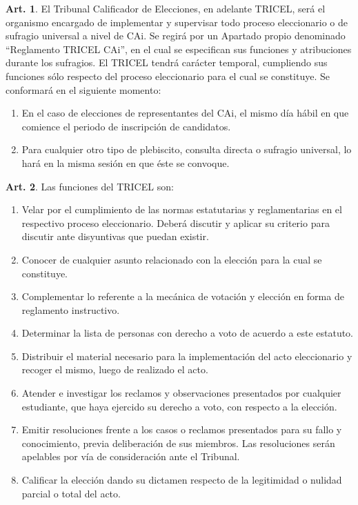 \documentclass[letterpaper,11pt]{article}
\theoremstyle{definition}%
\newtheorem{art}{Art.} %
\begin{document}
\begin{art}\label{definicionTRICEL}
	El Tribunal Calificador de Elecciones, en adelante TRICEL, será el organismo encargado de implementar y supervisar todo proceso eleccionario o de sufragio universal a nivel de CAi. Se regirá por un Apartado propio denominado ``Reglamento TRICEL CAi'', en el cual se especifican sus funciones y atribuciones durante los sufragios. El TRICEL tendrá carácter temporal, cumpliendo sus funciones sólo respecto del proceso eleccionario para el cual se constituye. Se conformará en el siguiente momento:
	\begin{enumerate}
		\item En el caso de elecciones de representantes del CAi, el mismo día hábil en que comience el periodo de inscripción de candidatos.
		\item Para cualquier otro tipo de plebiscito, consulta directa o sufragio universal, lo hará en la misma sesión en que éste se convoque.
	\end{enumerate}
\end{art}

\begin{art}\label{funcionesTRICEL}
	Las funciones del TRICEL son:
	\begin{enumerate}
		\item Velar por el cumplimiento de las normas estatutarias y reglamentarias en el respectivo proceso eleccionario. Deberá discutir y aplicar su criterio para discutir ante disyuntivas que puedan existir.
		\item Conocer de cualquier asunto relacionado con la elección para la cual se constituye.
		\item Complementar lo referente a la mecánica de votación y elección en forma de reglamento instructivo.
		\item Determinar la lista de personas con derecho a voto de acuerdo a este estatuto.
		\item Distribuir el material necesario para la implementación del acto eleccionario y recoger el mismo, luego de realizado el acto.
		\item Atender e investigar los reclamos y observaciones presentados por cualquier estudiante, que haya ejercido su derecho a voto, con respecto a la elección.
		\item Emitir resoluciones frente a los casos o reclamos presentados para su fallo y conocimiento, previa deliberación de sus miembros. Las resoluciones serán apelables por vía de consideración ante el Tribunal.
		\item Calificar la elección dando su dictamen respecto de la legitimidad o nulidad parcial o total del acto.
	\end{enumerate}
\end{art}
\end{document}
